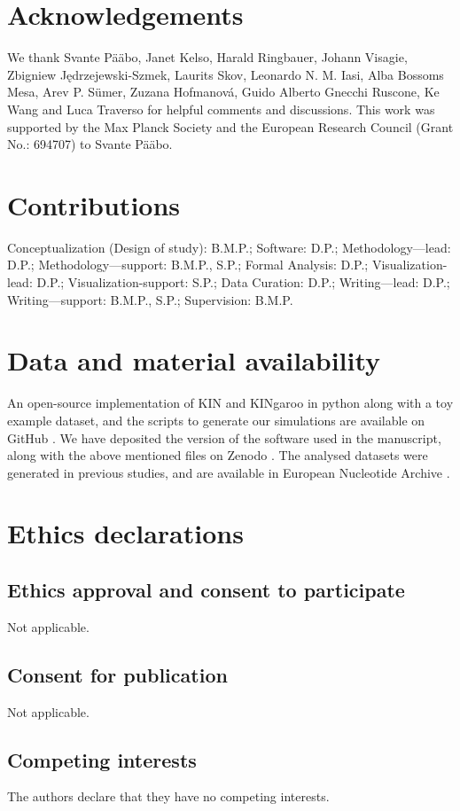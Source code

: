 \documentclass[12pt, letterpaper]{article}
\begin{document}
\section{Acknowledgements}
We thank Svante Pääbo, Janet Kelso, Harald Ringbauer, Johann Visagie, Zbigniew \linebreak Jędrzejewski-Szmek, Laurits Skov, Leonardo N. M. Iasi, Alba Bossoms Mesa, Arev P. Sümer, Zuzana Hofmanová, Guido Alberto Gnecchi Ruscone, Ke Wang and Luca Traverso for helpful comments and discussions. This work was supported by the Max Planck Society and the European Research Council (Grant No.: 694707) to Svante Pääbo.

\section{Contributions}
Conceptualization (Design of study): B.M.P.; Software: D.P.; Methodology—lead: D.P.; Methodology—support: B.M.P., S.P.; Formal Analysis: D.P.; Visualization-lead: D.P.; Visualization-support: S.P.; Data Curation: D.P.; Writing—lead: D.P.; Writing—support: B.M.P., S.P.; Supervision: B.M.P.

\section{Data and material availability}
An open-source implementation of KIN and KINgaroo in python along with a toy example dataset, and the scripts to generate our simulations are available on GitHub \cite{divyaratan_popli_httpsgithubcomdivyaratanpoplikinship_inferencereleasestagv313_2022}. We have deposited the version of the software used in the manuscript, along with the above mentioned files on Zenodo \cite{divyaratan_popli_httpsdoiorg105281zenodo7067142_nodate}. The analysed datasets were generated in previous studies, and are available in European Nucleotide Archive \cite{mittnik_kinship-based_nodate,skov_genetic_nodate}.

\section{Ethics declarations}
\subsection{Ethics approval and consent to participate}
Not applicable.

\subsection{Consent for publication}
Not applicable.

\subsection{Competing interests}
The authors declare that they have no competing interests.




\end{document}
